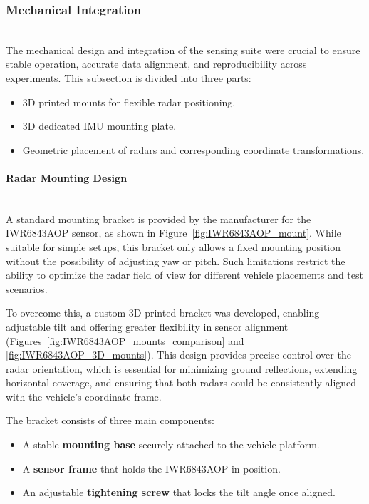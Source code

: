 \vspace{0.5em}
\subsubsection{Mechanical Integration}
\hfill
\\
\indent The mechanical design and integration of the sensing suite were crucial to ensure stable operation, accurate data alignment, and reproducibility across experiments. 
This subsection is divided into three parts:
\begin{itemize}
    \item 3D printed mounts for flexible radar positioning.  
    \item 3D dedicated IMU mounting plate.  
    \item Geometric placement of radars and corresponding coordinate transformations.  
\end{itemize}

\vspace{0.5em}
\paragraph{Radar Mounting Design}
\hfill
\\
\indent A standard mounting bracket is provided by the manufacturer for the IWR6843AOP sensor, as shown in Figure~\ref{fig:IWR6843AOP_mount}. 
While suitable for simple setups, this bracket only allows a fixed mounting position without the possibility of adjusting yaw or pitch. 
Such limitations restrict the ability to optimize the radar field of view for different vehicle placements and test scenarios.  

To overcome this, a custom 3D-printed bracket was developed, enabling adjustable tilt and offering greater flexibility in sensor alignment (Figures~\ref{fig:IWR6843AOP_mounts_comparison} and \ref{fig:IWR6843AOP_3D_mounts}). 
This design provides precise control over the radar orientation, which is essential for minimizing ground reflections, extending horizontal coverage, and ensuring that both radars could be consistently aligned with the vehicle’s coordinate frame.  

The bracket consists of three main components:  
\begin{itemize}
    \item A stable \textbf{mounting base} securely attached to the vehicle platform.  
    \item A \textbf{sensor frame} that holds the IWR6843AOP in position.  
    \item An adjustable \textbf{tightening screw} that locks the tilt angle once aligned.  
\end{itemize}

